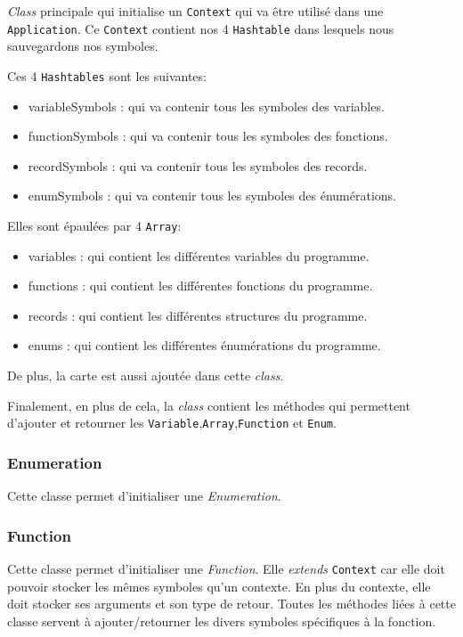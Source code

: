 \emph{Class} principale qui initialise un \texttt{Context} qui va être utilisé dans une \texttt{Application}. Ce \texttt{Context} contient nos 4 \texttt{Hashtable} dans lesquels nous sauvegardons nos symboles.

Ces 4 \texttt{Hashtables} sont les suivantes:

\begin{itemize}
    \item variableSymbols : qui va contenir tous les symboles des variables.
    \item functionSymbols : qui va contenir tous les symboles des fonctions.
    \item recordSymbols : qui va contenir tous les symboles des records.
    \item enumSymbols : qui va contenir tous les symboles des énumérations.
\end{itemize}

Elles sont épaulées par 4 \texttt{Array}:
\begin{itemize}

    \item variables : qui contient les différentes variables du programme.
    \item functions : qui contient les différentes fonctions du programme.
    \item records : qui contient les différentes structures du programme.
    \item enums : qui contient les différentes énumérations du programme.
\end{itemize}

De plus, la carte est aussi ajoutée dans cette \emph{class}.

Finalement, en plus de cela, la \emph{class} contient les méthodes qui permettent d'ajouter et retourner les \texttt{Variable},\texttt{Array},\texttt{Function} et \texttt{Enum}.

\subsubsection{Enumeration}

Cette classe permet d'initialiser une \emph{Enumeration}.

\subsubsection{Function}

Cette classe permet d'initialiser une \emph{Function}. Elle \emph{extends} \texttt{Context} car elle doit pouvoir stocker les mêmes symboles qu'un contexte. En plus du contexte, elle doit stocker ses arguments et son type de retour.
Toutes les méthodes liées à cette classe servent à ajouter/retourner les divers symboles spécifiques à la fonction.

